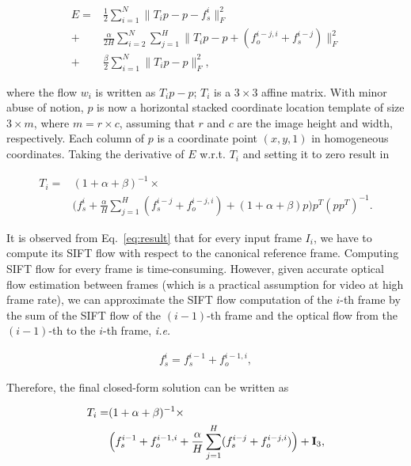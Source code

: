 \documentclass[review]{elsarticle}
\begin{document}
\begin{align}
\label{data_affine}
E		=&\frac{1}{2}\sum_{i=1}^{N}\parallel{T_ip-p-f_s^i}\parallel_F^2
\\\label{smooth_affine}
+&\frac{\alpha}{2H}\sum_{i=2}^{N}\sum_{j=1}^{H}\parallel{T_ip-p+(f_o^{i-j,i}+f_s^{i-j})}\parallel_F^2
\\\label{penalty_affine}
+&\frac{\beta}{2}\sum_{i=1}^{N}\parallel{T_ip-p}\parallel_F^2,
\end{align} 

\noindent where the flow $w_i$ is written as $T_ip-p$; $T_i$ is a $3\times3$ affine matrix. With minor
abuse of notion, $p$ is now a horizontal stacked coordinate location template of size $3\times m$, where $m=r\times c$, assuming that $r$ and $c$ are the image height and width, respectively. Each column of $p$ is a coordinate point $(x,y,1)$ in homogeneous coordinates. Taking the derivative of $E$ w.r.t. $T_i$ and setting it to zero result in 

\begin{equation}
\begin{aligned}
\label{eq:result}
T_i=&(1+\alpha+\beta)^{-1}\times \\
&\Big(f_s^i+\frac{\alpha}{H}\sum_{j=1}^H(f_s^{i-j}+f_o^{i-j,i})+(1+\alpha+\beta)p\Big)p^T(pp^T)^{-1}.
\end{aligned}
\end{equation}

It is observed from Eq.~\eqref{eq:result} that for every input frame $I_i$, we have to compute its SIFT flow with respect to the canonical reference frame. Computing SIFT flow for every frame is time-consuming. However, given accurate optical flow estimation between frames (which is a practical assumption for video at high frame rate), we can approximate the SIFT flow computation of the $i$-th frame by the sum of the SIFT flow of the $(i-1)$-th frame and the optical flow from the $(i-1)$-th to the $i$-th frame, \textit{i.e.}

\begin{align}
\label{eq:approx}
f_s^i=f_s^{i-1}+f_o^{i-1,i},
\end{align}

Therefore, the final closed-form solution can be written as

\begin{align}
\label{eq:final}
T_i=&(1+\alpha+\beta)^{-1}\times \nonumber \\
&\Big(f_s^{i-1}+f_o^{i-1,i}+\frac{\alpha}{H}\sum_{j=1}^H(f_s^{i-j}+f_o^{i-j,i})\Big) + {\bf I}_3, \nonumber \\
\end{align}
\end{document}
